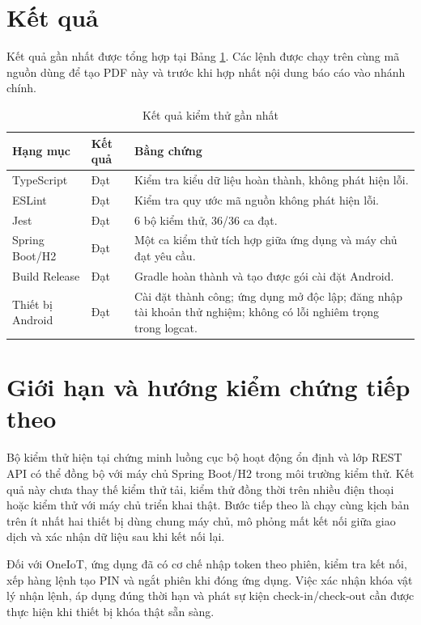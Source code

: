 \section{Kết quả}

Kết quả gần nhất được tổng hợp tại Bảng \ref{tab:results}. Các lệnh được chạy trên cùng mã nguồn dùng để tạo PDF này và trước khi hợp nhất nội dung báo cáo vào nhánh chính.

\begin{table}[H]
\centering
\caption{Kết quả kiểm thử gần nhất}
\label{tab:results}
\small
\begin{tabularx}{\textwidth}{>{\raggedright\arraybackslash}p{4.0cm}>{\centering\arraybackslash}p{2.2cm}X}
\toprule
\rowcolor{RoomHubLight}
\textbf{Hạng mục} & \textbf{Kết quả} & \textbf{Bằng chứng} \\
\midrule
TypeScript & Đạt & Kiểm tra kiểu dữ liệu hoàn thành, không phát hiện lỗi. \\
ESLint & Đạt & Kiểm tra quy ước mã nguồn không phát hiện lỗi. \\
Jest & Đạt & 6 bộ kiểm thử, 36/36 ca đạt. \\
Spring Boot/H2 & Đạt & Một ca kiểm thử tích hợp giữa ứng dụng và máy chủ đạt yêu cầu. \\
Build Release & Đạt & Gradle hoàn thành và tạo được gói cài đặt Android. \\
Thiết bị Android & Đạt & Cài đặt thành công; ứng dụng mở độc lập; đăng nhập tài khoản thử nghiệm; không có lỗi nghiêm trọng trong logcat. \\
\bottomrule
\end{tabularx}
\end{table}

\section{Giới hạn và hướng kiểm chứng tiếp theo}

Bộ kiểm thử hiện tại chứng minh luồng cục bộ hoạt động ổn định và lớp REST API có thể đồng bộ với máy chủ Spring Boot/H2 trong môi trường kiểm thử. Kết quả này chưa thay thế kiểm thử tải, kiểm thử đồng thời trên nhiều điện thoại hoặc kiểm thử với máy chủ triển khai thật. Bước tiếp theo là chạy cùng kịch bản trên ít nhất hai thiết bị dùng chung máy chủ, mô phỏng mất kết nối giữa giao dịch và xác nhận dữ liệu sau khi kết nối lại.

Đối với OneIoT, ứng dụng đã có cơ chế nhập token theo phiên, kiểm tra kết nối, xếp hàng lệnh tạo PIN và ngắt phiên khi đóng ứng dụng. Việc xác nhận khóa vật lý nhận lệnh, áp dụng đúng thời hạn và phát sự kiện check-in/check-out cần được thực hiện khi thiết bị khóa thật sẵn sàng.
